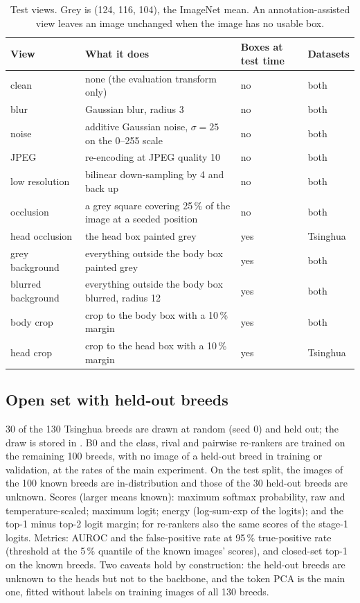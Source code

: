 \documentclass[11pt,a4paper]{article}
\theoremstyle{plain}
\newcommand{\fn}[1]{\texttt{\detokenize{#1}}}
\begin{document}
\begin{table}[!htbp]
\centering
\caption{Test views. Grey is (124, 116, 104), the ImageNet mean. An annotation-assisted view leaves an image unchanged
when the image has no usable box.}
\label{tab:views}
\small
\begin{tabularx}{\textwidth}{@{}lYll@{}}
\toprule
View & What it does & Boxes at test time & Datasets\\
\midrule
clean & none (the evaluation transform only) & no & both\\
blur & Gaussian blur, radius 3 & no & both\\
noise & additive Gaussian noise, $\sigma=25$ on the 0--255 scale & no & both\\
JPEG & re-encoding at JPEG quality 10 & no & both\\
low resolution & bilinear down-sampling by 4 and back up & no & both\\
occlusion & a grey square covering 25\,\% of the image at a seeded position & no & both\\
\midrule
head occlusion & the head box painted grey & yes & Tsinghua\\
grey background & everything outside the body box painted grey & yes & both\\
blurred background & everything outside the body box blurred, radius 12 & yes & both\\
body crop & crop to the body box with a 10\,\% margin & yes & both\\
head crop & crop to the head box with a 10\,\% margin & yes & Tsinghua\\
\bottomrule
\end{tabularx}
\end{table}

\subsection{Open set with held-out breeds}\label{sec:protocol-openset}
30 of the 130 Tsinghua breeds are drawn at random (seed 0) and held out; the draw is stored in
\fn{configs/openset/tsinghua_unknown30_s0.json}. B0 and the class, rival and pairwise re-rankers are trained on the
remaining 100 breeds, with no image of a held-out breed in training or validation, at the rates of the main
experiment. On the test split, the images of the 100 known breeds are in-distribution and those of the 30 held-out
breeds are unknown. Scores (larger means known): maximum softmax probability, raw and temperature-scaled; maximum
logit; energy (log-sum-exp of the logits); and the top-1 minus top-2 logit margin; for re-rankers also the same scores
of the stage-1 logits. Metrics: AUROC and the false-positive rate at 95\,\% true-positive rate (threshold at the
5\,\% quantile of the known images' scores), and closed-set top-1 on the known breeds. Two caveats hold by
construction: the held-out breeds are unknown to the heads but not to the backbone, and the token PCA is the main
one, fitted without labels on training images of all 130 breeds.
\end{document}
